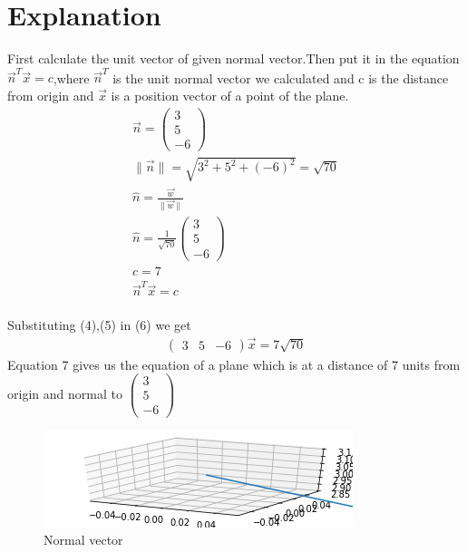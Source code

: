 \documentclass[journal,12pt,twocolumn]{IEEEtran}
\newcommand{\norm}[1]{\| #1 \|}
\begin{document}
\section{Explanation}
First calculate the unit vector of given normal vector.Then put it in the equation $ \vec{n}^T\vec{x} = c$,where $\vec{n}^T$ is the unit normal vector we calculated and c is the distance from origin and $\vec{x}$ is a position vector of a point of the plane.
\vspace{2mm}
\begin{align}
    \vec{n}=\begin{pmatrix}3\\5\\-6\end{pmatrix}\\
    \norm{\vec{n}}=\sqrt{3^2+5^2+(-6)^2}=\sqrt{70}\\
    \hat{n}=\frac{\vec{w}}{\norm{\vec{w}}}\\
    \hat{n}=\frac{1}{\sqrt{70}}\begin{pmatrix}3\\5\\-6\end{pmatrix}\\
    c=7\\
    \vec{n}^T\vec{x} = c
\end{align}
\vspace{2mm}\\
Substituting (4),(5) in (6) we get\\
\begin{align}
    \boxed{\begin{pmatrix}3 & 5 & -6\end{pmatrix}\vec{x}=7\sqrt{70}}
\end{align}
Equation 7 gives us the equation of a plane which is at a distance of 7 units from origin and normal to $\begin{pmatrix}3\\5\\-6\end{pmatrix}$
\begin{figure}[h!]
	\centering
	\includegraphics[width=\columnwidth]{vector.png}
	\caption{Normal vector}
	\label{myfig1}
\end{figure}
\end{document}
